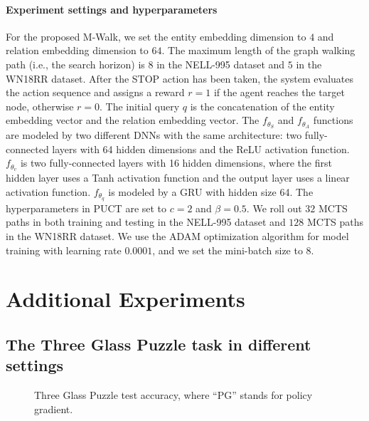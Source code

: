 \documentclass{article}
\newcommand{\modelname}{M-Walk}
\begin{document}
\paragraph{Experiment settings and hyperparameters}
For the proposed \modelname, we set the entity embedding dimension to $4$ and relation embedding dimension to $64$.
The maximum length of the graph walking path (i.e., the search horizon) is $8$ in the NELL-995 dataset and $5$ in the WN18RR dataset.
After the STOP action has been taken, the system evaluates the action sequence and assigns a reward $r = 1$ if the agent reaches the target node, otherwise  $r = 0$.
The initial query $q$ is the concatenation of the entity embedding vector and the relation embedding vector. 
The $f_{{\theta}_{S}}$ and $f_{{\theta}_{A}}$ functions are modeled by two different DNNs with the same architecture: two fully-connected layers with 64 hidden dimensions and the ReLU activation function.
$f_{{\theta}_{v}}$ is two fully-connected layers with 16 hidden dimensions, where the first hidden layer uses a Tanh activation function and the output layer uses a linear activation function. 
$f_{{\theta}_{q}}$ is modeled by a GRU with hidden size 64.
The hyperparameters in PUCT are set to $c=2$ and $\beta=0.5$. 
We roll out $32$ MCTS paths in both training and testing in the NELL-995 dataset and $128$ MCTS paths in the WN18RR dataset.
We use the ADAM optimization algorithm for model training with learning rate $0.0001$, and we set the mini-batch size to $8$.







\section{Additional Experiments}
\label{Appendix:AdditionalExperiments}
\subsection{The Three Glass Puzzle task in different settings}
\label{Appendix:MCTSTesting}


	
	\begin{figure}[t!]
		\centering
		\caption{Three Glass Puzzle test accuracy, where ``PG'' stands for policy gradient.}
		\label{fig:puzzle_test_accuracy}
	\end{figure}
\end{document}
